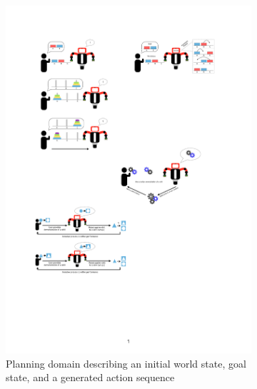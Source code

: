 \begin{figure}[htp]
	\centering
	
	\begin{subfigure}[t]{0.54\textwidth}
		\includegraphics[width=\textwidth]{figures/PbD-AutomatedPlanner}
		\caption{Planning domain describing an initial world state, goal state, and a generated action sequence}
		\label{fig:Planning domain}
	\end{subfigure}
\hfill
	\begin{subfigure}[t]{0.44\textwidth}

\end{subfigure}
\end{figure}
